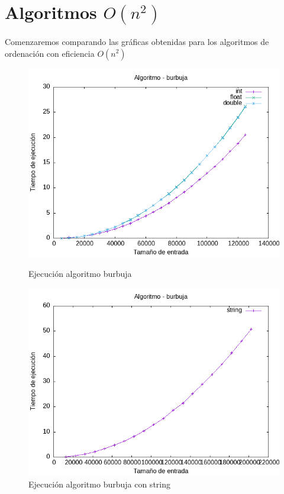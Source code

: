 \documentclass[11pt,openany]{book}
\begin{document}
    \section{Algoritmos  \(O(n^2)\)}
    Comenzaremos comparando las gráficas obtenidas para los algoritmos de ordenación con eficiencia \(O(n^2)\)
    \begin{figure}[H]
        \begin{minipage}{0.5\textwidth}
            \centering
            \includegraphics[width=\linewidth]{assets/Img/burbuja.png}
            \caption{Ejecución algoritmo burbuja}
            \label{fig:burbuja}
        \end{minipage}%
        \begin{minipage}{0.5\textwidth}
            \centering
            \includegraphics[width=\linewidth]{assets/Img/burbujastring.png}
            \caption{Ejecución algoritmo burbuja con string}
            \label{fig:burbujastring}
        \end{minipage}
    \end{figure}
\end{document}
